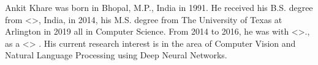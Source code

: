 

{Ankit Khare} was born in Bhopal, M.P., India in 1991. He received his B.S. degree from <>, India, in 2014, his M.S. degree from The University of Texas at Arlington in 2019 all in Computer Science. From 2014 to 2016, he was with <>., as a <> . His current research interest is in the area of Computer Vision and Natural Language Processing using Deep Neural Networks.
